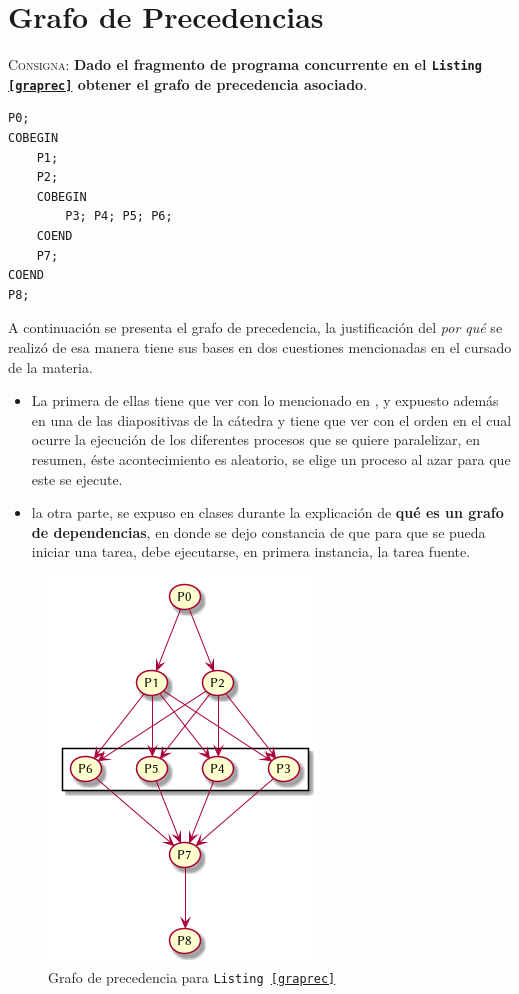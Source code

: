 \documentclass{article}
\begin{document}
\section{Grafo de Precedencias}
\textsc{Consigna}: \textbf{Dado el fragmento de programa concurrente en el \texttt{Listing \ref{graprec}} obtener el grafo de precedencia asociado}.

\begin{lstlisting}[caption={Fragmento de programa concurrente}, label=graprec]
P0;
COBEGIN
	P1;
	P2;
	COBEGIN
		P3; P4; P5; P6;
	COEND
	P7;
COEND
P8;
\end{lstlisting}

A continuaci\'on se presenta el grafo de precedencia, la justificaci\'on del \textit{por qu\'e} se realiz\'o de esa manera tiene  sus bases en dos cuestiones mencionadas en el cursado de la materia.
\begin{itemize}
\item La primera de ellas tiene que ver con lo mencionado en \cite{gortazarbellas}, y expuesto adem\'as en una de las diapositivas de la c\'atedra y tiene que ver con el orden en el cual ocurre la ejecuci\'on de los diferentes procesos que se quiere paralelizar, en resumen, \'este acontecimiento es aleatorio, se elige un proceso al azar para que este se ejecute.
\item la otra parte, se expuso en clases durante la explicaci\'on de \textbf{qu\'e es un grafo de dependencias}, en donde se dejo constancia de que para que se pueda iniciar una tarea, debe ejecutarse, en primera instancia, la tarea fuente.
\end{itemize}


\begin{figure}[H]
  \centering
  \includegraphics[width=.4\linewidth]{grafo_precedencia.png}
  \caption{Grafo de precedencia para \texttt{Listing \ref{graprec}}}
  \label{fig:graprec}
\end{figure}
\end{document}

